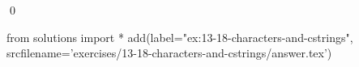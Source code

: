 
\begin{ex}
  \label{ex:13-18-characters-and-cstrings}
  
  \qed
\end{ex}
\begin{python0}
from solutions import *
add(label="ex:13-18-characters-and-cstrings",
    srcfilename='exercises/13-18-characters-and-cstrings/answer.tex')
\end{python0}

